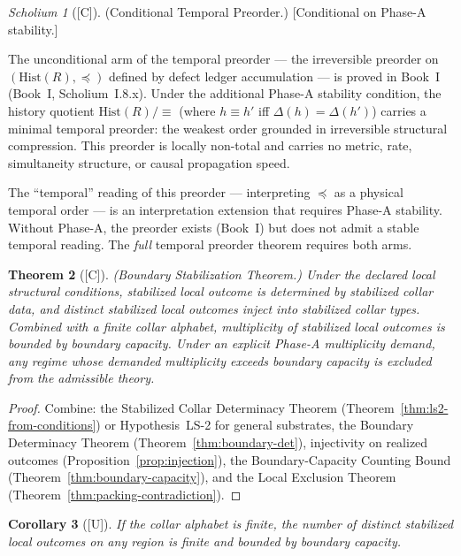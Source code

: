 \documentclass[12pt,oneside]{amsbook}
\theoremstyle{plain}
\newtheorem{theorem}{Theorem}[section]
\newtheorem{corollary}[theorem]{Corollary}
\theoremstyle{definition}
\theoremstyle{remark}
\newtheorem{scholium}[theorem]{Scholium}
\newcommand{\status}[1]{\textup{[#1]}}
\begin{document}
\begin{scholium}[\status{C}]\label{sch:temporal-preorder-phaseA}
\textup{(Conditional Temporal Preorder.)}
\textup{[Conditional on Phase-A stability.]}

The unconditional arm of the temporal preorder — the irreversible
preorder on $(\mathrm{Hist}(R), \preceq)$ defined by defect ledger
accumulation — is proved in Book~I
(Book~I, Scholium~I.8.x).  Under the additional
Phase-A stability condition, the history quotient
$\mathrm{Hist}(R)/{\equiv}$ (where $h \equiv h'$ iff
$\Delta(h) = \Delta(h')$) carries a minimal temporal preorder: the
weakest order grounded in irreversible structural compression.  This
preorder is locally non-total and carries no metric, rate,
simultaneity structure, or causal propagation speed.

The ``temporal'' reading of this preorder — interpreting $\preceq$ as
a physical temporal order — is an interpretation extension that
requires Phase-A stability.  Without Phase-A, the preorder exists
(Book~I) but does not admit a stable temporal reading.  The
\emph{full} temporal preorder theorem requires both arms.
\end{scholium}

\begin{theorem}[\status{C}]\label{thm:governing}
\textup{(Boundary Stabilization Theorem.)}  Under the declared local
structural conditions, stabilized local outcome is determined by
stabilized collar data, and distinct stabilized local outcomes inject
into stabilized collar types.  Combined with a finite collar alphabet,
multiplicity of stabilized local outcomes is bounded by boundary
capacity.  Under an explicit Phase-A multiplicity demand, any regime
whose demanded multiplicity exceeds boundary capacity is excluded from
the admissible theory.
\end{theorem}

\begin{proof}
Combine: the Stabilized Collar Determinacy Theorem
(Theorem~\ref{thm:ls2-from-conditions}) or Hypothesis~LS-2 for general
substrates, the Boundary Determinacy Theorem
(Theorem~\ref{thm:boundary-det}), injectivity on realized outcomes
(Proposition~\ref{prop:injection}), the Boundary-Capacity Counting
Bound (Theorem~\ref{thm:boundary-capacity}), and the Local Exclusion
Theorem (Theorem~\ref{thm:packing-contradiction}).
\end{proof}

\begin{corollary}[\status{U}]\label{cor:finite-collar-finite-outcomes}
If the collar alphabet is finite, the number of distinct stabilized
local outcomes on any region is finite and bounded by boundary
capacity.
\end{corollary}
\end{document}
